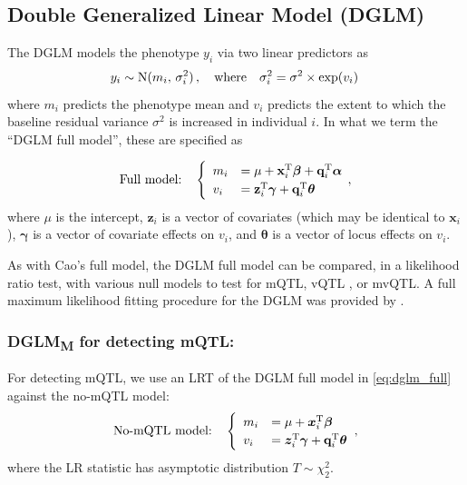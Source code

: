 \subsection{Double Generalized Linear Model (DGLM)}

  The DGLM models the phenotype $y_i$ via two linear predictors as
  \[
    y_i \sim \mathrm{N}(m_i, \,\sigma_i^2)\,,\\
    \quad\text{where}\quad\sigma^2_i = \sigma^2 \times \exp(v_i)\,
  \]
  where $m_i$ predicts the phenotype mean and $v_i$ predicts the extent to which the baseline residual variance $\sigma^2$ is increased in individual $i$.
  In what we term the ``DGLM full model'', these are specified as

  \begin{equation}\label{eq:dglm_full}
    \text{Full model:}\quad
    \begin{cases}
    \enskip m_i &= \mu + \mathbf{x}_i^\mathrm{T}\bm{\beta} + \mathbf{q}_i^\mathrm{T}\bm{\alpha}\\
    \enskip v_i &= \mathbf{z}_i^\mathrm{T}\bm{\gamma} + \mathbf{q}_i^\mathrm{T}\bm{\theta}
    \end{cases}
    \,,
  \end{equation}
  where $\mu$ is the intercept, $\mathbf{z}_i$ is a vector of covariates (which may be identical to $\mathbf{x}_i$),
  $\bm{\gamma}$ is a vector of covariate effects on $v_i$,
  and $\bm{\theta}$ is a vector of locus effects on $v_i$.

  As with Cao's full model, the DGLM full model can be compared, in a likelihood ratio test, with various null models to test for mQTL, vQTL \citep{Ronnegard2011a}, or mvQTL.
  A full maximum likelihood fitting procedure for the DGLM was provided by \cite{Smyth1989}.
  
  \subsubsection{DGLM\textsubscript{M} for detecting mQTL:}
    For detecting mQTL, we use an LRT of the {DGLM full model} in \autoref{eq:dglm_full} against the {no-mQTL model}:
    \begin{equation}\label{eq:dglmm_null}
      \text{No-mQTL model:}\quad
      \begin{cases}
      \enskip m_i &= \mu + \bm{x}_i^\mathrm{T}\bm{\beta}\\
      \enskip v_i &= \bm{z}_i^\mathrm{T}\bm{\gamma} + \mathbf{q}_i^\mathrm{T}\bm{\theta}
      \end{cases}
      \;,
    \end{equation}
    where the LR statistic has asymptotic distribution $T\sim\chi^2_2$.

